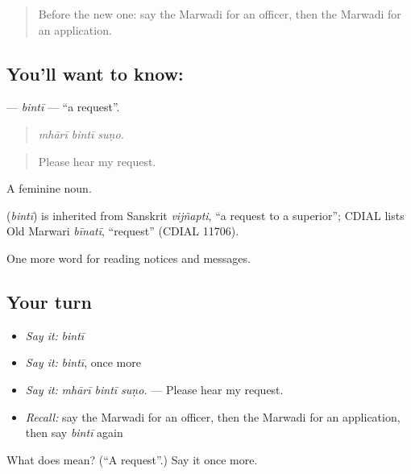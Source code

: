 \begin{quote}
Before the new one: say the Marwadi for an officer, then the Marwadi for an application.
\end{quote}

\subsection*{You'll want to know: }
\textbf{} — \emph{bintī} — \textquotedblleft{}a request\textquotedblright{}.

\begin{quote}
  
\end{quote}

\begin{quote}
\emph{mhārī bintī suṇo.}
\end{quote}

\begin{quote}
Please hear my request.
\end{quote}

A feminine noun.

\begin{cousinweb}
\textbf{} (\emph{bintī}) is inherited from Sanskrit \emph{vijñapti}, \textquotedblleft{}a request to a superior\textquotedblright{}; CDIAL lists Old Marwari \emph{bīnatī}, \textquotedblleft{}request\textquotedblright{} (CDIAL 11706).
\end{cousinweb}

\begin{grammarlens}[title={What you've built}]
One more word for reading notices and messages.
\end{grammarlens}

\subsection*{Your turn}
\begin{itemize}
\raggedright
  \item \emph{Say it:} \emph{bintī}
  \item \emph{Say it:} \emph{bintī}, once more
  \item \emph{Say it:} \emph{mhārī bintī suṇo.} — Please hear my request.
  \item \emph{Recall:} say the Marwadi for an officer, then the Marwadi for an application, then say \emph{bintī} again
\end{itemize}

\begin{tcolorbox}[breakable,colback=teal!4,colframe=teal!35!black,title={Before you move on}]
What does  mean? (\textquotedblleft{}A request\textquotedblright{}.) Say it once more.
\end{tcolorbox}

